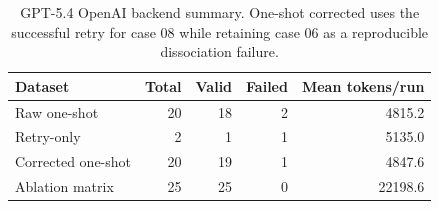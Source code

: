 \begin{table}[h]
\centering
\caption{GPT-5.4 OpenAI backend summary. One-shot corrected uses the successful retry for case 08 while retaining case 06 as a reproducible dissociation failure.}
\label{tab:gpt54-openai-summary}
\begin{tabular}{lrrrr}
\toprule
Dataset & Total & Valid & Failed & Mean tokens/run \\
\midrule
Raw one-shot & 20 & 18 & 2 & 4815.2 \\
Retry-only & 2 & 1 & 1 & 5135.0 \\
Corrected one-shot & 20 & 19 & 1 & 4847.6 \\
Ablation matrix & 25 & 25 & 0 & 22198.6 \\
\bottomrule
\end{tabular}
\end{table}
